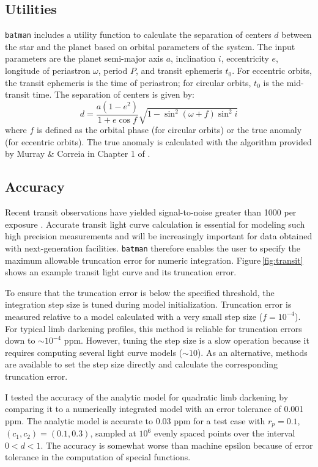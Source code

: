 \documentclass[12pt,preprint]{aastex}
\begin{document}
\subsection{Utilities}
\texttt{batman} includes a utility function to calculate the separation of centers $d$ between the star and the planet based on orbital parameters of the system.  The input parameters are the planet semi-major axis $a$, inclination $i$, eccentricity $e$, longitude of periastron $\omega$, period $P$, and transit ephemeris $t_0$.  For eccentric orbits, the transit ephemeris is the time of periastron; for circular orbits, $t_0$ is the mid-transit time.  The separation of centers is given by:
$$
d = \frac{a(1-e^2)}{1+e\cos{f}}\sqrt{1-\sin^2{(\omega+f)}\sin^2{i}}
$$
where $f$ is defined as the orbital phase (for circular orbits) or the true anomaly (for eccentric orbits).  The true anomaly is calculated with the algorithm provided by Murray \& Correia in Chapter 1 of \cite{seager10}.

\subsection{Accuracy}
Recent transit observations have yielded signal-to-noise greater than 1000 per exposure \citep[e.g.][]{kreidberg14a, knutson14b}.  Accurate transit light curve calculation is essential for modeling such high precision measurements and will be increasingly important for data obtained with next-generation facilities.  \texttt{batman} therefore enables the user to specify the maximum allowable truncation error for numeric integration.  Figure\,\ref{fig:transit} shows an example transit light curve and its truncation error.

To ensure that the truncation error is below the specified threshold, the integration step size is tuned during model initialization.  Truncation error is measured relative to a model calculated with a very small step size ($f = 10^{-4}$).  For typical limb darkening profiles, this method is reliable for truncation errors down to $\sim 10^{-4}$ ppm. However, tuning the step size is a slow operation because it requires computing several light curve models ($\sim10$). As an alternative, methods are available to set the step size directly and calculate the corresponding truncation error. 

I tested the accuracy of the analytic model for quadratic limb darkening by comparing it to a numerically integrated model with an error tolerance of 0.001 ppm.  The analytic model is accurate to 0.03 ppm for a test case with $r_p = 0.1$, $(c_1, c_2) = (0.1, 0.3)$, sampled at $10^6$ evenly spaced points over the interval $0 < d < 1$.  The accuracy is somewhat worse than machine epsilon because of error tolerance in the computation of special functions.
\end{document}
